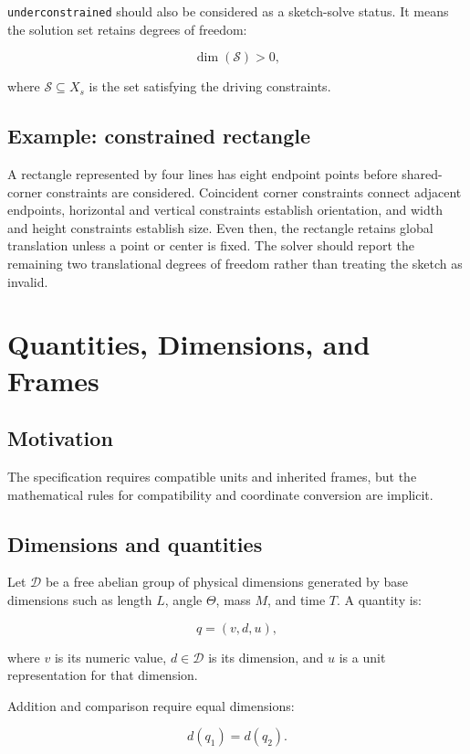 \documentclass[11pt]{article}
\newcommand{\Type}[1]{\texttt{#1}}
\begin{document}
\Type{underconstrained} should also be considered as a sketch-solve status. It
means the solution set retains degrees of freedom:

\[
\dim(\mathcal{S})>0,
\]

where $\mathcal{S}\subseteq X_s$ is the set satisfying the driving constraints.

\subsection{Example: constrained rectangle}

A rectangle represented by four lines has eight endpoint points before
shared-corner constraints are considered. Coincident corner constraints connect
adjacent endpoints, horizontal and vertical constraints establish orientation,
and width and height constraints establish size. Even then, the rectangle
retains global translation unless a point or center is fixed. The solver should
report the remaining two translational degrees of freedom rather than treating
the sketch as invalid.

\section{Quantities, Dimensions, and Frames}

\subsection{Motivation}

The specification requires compatible units and inherited frames, but the
mathematical rules for compatibility and coordinate conversion are implicit.

\subsection{Dimensions and quantities}

Let $\mathcal{D}$ be a free abelian group of physical dimensions generated by
base dimensions such as length $L$, angle $\Theta$, mass $M$, and time $T$. A
quantity is:

\[
q=(v,d,u),
\]

where $v$ is its numeric value, $d\in\mathcal{D}$ is its dimension, and $u$ is
a unit representation for that dimension.

Addition and comparison require equal dimensions:

\[
d(q_1)=d(q_2).
\]
\end{document}
